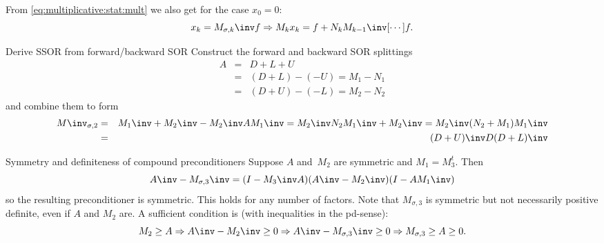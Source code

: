 From \eqref{eq:multiplicative:stat:mult} we also get for the case $x_0=0$:
\begin{equation}
    x_k=M_{\sigma,k}\inv f\Rightarrow M_kx_k = f+N_kM_{k-1}\inv[\cdots]f.
    \label{eq:x-from-zero}\end{equation}

\begin{example}{Derive SSOR from forward/backward SOR}
Construct the forward and backward SOR splittings
\begin{eqnarray*} A&=&D+L+U \\
    &=& (D+L)-(-U) = M_1-N_1\\
    &=& (D+U)-(-L) = M_2-N_2
\end{eqnarray*}
and combine them to form
\begin{eqnarray*}
 M\inv_{\sigma,2}
        &=& M_1\inv+M_2\inv-M_2\inv AM_1\inv=
		M_2\inv N_2M_1\inv+M_2\inv=M_2\inv(N_2+M_1)M_1\inv \\
        &=& (D+U)\inv D(D+L)\inv
\end{eqnarray*}
\end{example}

\begin{remark}{Symmetry and definiteness of compound preconditioners}
Suppose $A$ and~$M_2$ are symmetric and $M_1=M_3^t$. Then
 \begin{equation}
 A\inv-M_{\sigma,3}\inv = (I-M_3\inv A)(A\inv -M_2\inv)(I-AM_1\inv)
                \label{eq:compound-3-prec}\end{equation}
so the resulting preconditioner is symmetric.
This holds for any number of factors. Note that $M_{\sigma,3}$ is symmetric
but not necessarily positive definite, even if $A$ and $M_2$ are.
A sufficient condition is (with inequalities in the pd-sense):
\[ M_2\geq A\Rightarrow A\inv-M_2\inv\geq 0\Rightarrow 
    A\inv-M_{\sigma,3}\inv\geq0 \Rightarrow M_{\sigma,3}\geq A\geq 0.\]
\end{remark}

